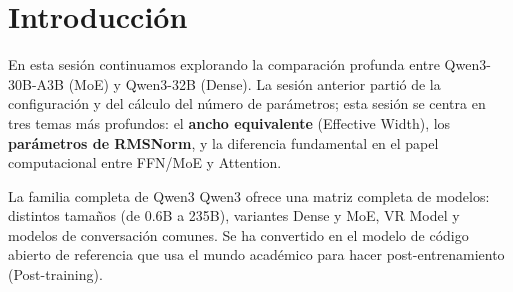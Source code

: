 \section{Introducción}

En esta sesión continuamos explorando la comparación profunda entre Qwen3-30B-A3B (MoE) y Qwen3-32B (Dense). La sesión anterior partió de la configuración y del cálculo del número de parámetros; esta sesión se centra en tres temas más profundos: el \textbf{ancho equivalente} (Effective Width), los \textbf{parámetros de RMSNorm}, y la diferencia fundamental en el papel computacional entre FFN/MoE y Attention.

\begin{knowledgebox}{La familia completa de Qwen3}
Qwen3 ofrece una matriz completa de modelos: distintos tamaños (de 0.6B a 235B), variantes Dense y MoE, VR Model y modelos de conversación comunes. Se ha convertido en el modelo de código abierto de referencia que usa el mundo académico para hacer post-entrenamiento (Post-training).
\end{knowledgebox}

